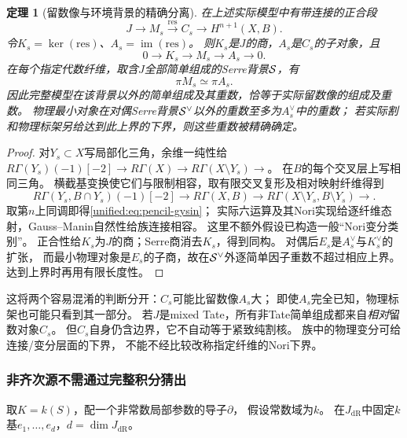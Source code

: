 \documentclass[11pt,a4paper,oneside]{ctexart}
\theoremstyle{cnplain}
\newtheorem{theorem}{定理}[section]
\theoremstyle{definition}
\theoremstyle{remark}
\newcommand{\im}{\operatorname{im}}
\newcommand{\dR}{\mathrm{dR}}
\numberwithin{equation}{section}
\begin{document}
\begin{theorem}[留数像与环境背景的精确分离]\label{unified:thm:pencil-separation}
在上述实际模型中有带连接的正合段
\begin{equation}\label{unified:eq:pencil-gysin}
 J\longrightarrow M_s\xrightarrow{\mathrm{res}}C_s
       \longrightarrow H^{n+1}(X,B).
\end{equation}
令$K_s=\ker(\mathrm{res})$、$A_s=\im(\mathrm{res})$。
则$K_s$是$J$的商，$A_s$是$C_s$的子对象，且
\[
 0\longrightarrow K_s\longrightarrow M_s\longrightarrow A_s
 \longrightarrow0.
\]
在每个指定代数纤维，取含$J$全部简单组成的Serre背景$\mathcal S$，有
\[
 \pi M_s\simeq\pi A_s.
\]
因此完整模型在该背景以外的简单组成及其重数，恰等于实际留数像的组成及重数。
物理最小对象在对偶Serre背景$\mathcal S^\vee$以外的重数至多为$A_s^\vee$中的重数；
若实际割和物理标架另给达到此上界的下界，则这些重数被精确确定。
\end{theorem}
\begin{proof}
对$Y_s\subset X$写局部化三角，余维一纯性给
$R\Gamma(Y_s)(-1)[-2]\to R\Gamma(X)\to
R\Gamma(X\setminus Y_s)\to$。
在$B$的每个交叉层上写相同三角。
横截基变换使它们与限制相容，取有限交叉复形及相对映射纤维得到
\[
 R\Gamma(Y_s,B\cap Y_s)(-1)[-2]\longrightarrow
 R\Gamma(X,B)\longrightarrow
 R\Gamma(X\setminus Y_s,B\setminus Y_s)\longrightarrow.
\]
取第$n$上同调即得\eqref{unified:eq:pencil-gysin}；
实际六运算及其Nori实现给逐纤维态射，Gauss--Manin自然性给族连接相容。
这里不额外假设已构造一般“Nori变分类别”。
正合性给$K_s$为$J$的商；Serre商消去$K_s$，得到同构。
对偶后$E_s$是$A_s^\vee$与$K_s^\vee$的扩张，
而最小物理对象是$E_s$的子商，故在$\mathcal S^\vee$外逐简单因子重数不超过相应上界。
达到上界时再用有限长度性。
\end{proof}

这将两个容易混淆的判断分开：$C_s$可能比留数像$A_s$大；
即使$A_s$完全已知，物理标架也可能只看到其一部分。
若$J$是mixed Tate，所有非Tate简单组成都来自\emph{相对}留数对象$C_s$。
但$C_s$自身仍含边界，它不自动等于紧致纯割核。
族中的物理变分可给连接/变分层面的下界，
不能不经比较改称指定纤维的Nori下界。

\subsubsection{非齐次源不需通过完整积分猜出}
取$K=k(S)$，配一个非常数局部参数的导子$\partial$，
假设常数域为$k$。
在$J_{\dR}$中固定$k$基$e_1,\ldots,e_d$，$d=\dim J_{\dR}$。
\end{document}
